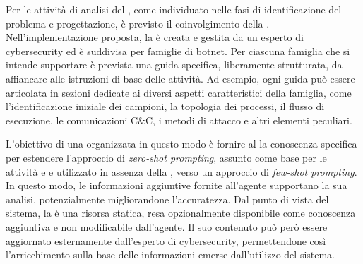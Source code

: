 Per le attività di analisi del \sreagent{}, come individuato nelle fasi di identificazione del problema e progettazione, è previsto il coinvolgimento della \kb{}. Nell'implementazione proposta, la \kb{} è creata e gestita da un esperto di cybersecurity ed è suddivisa per famiglie di botnet. Per ciascuna famiglia che si intende supportare è prevista una guida specifica, liberamente strutturata, da affiancare alle istruzioni di base delle attività. Ad esempio, ogni guida può essere articolata in sezioni dedicate ai diversi aspetti caratteristici della famiglia, come l'identificazione iniziale dei campioni, la topologia dei processi, il flusso di esecuzione, le comunicazioni C\&C, i metodi di attacco e altri elementi peculiari.




L'obiettivo di una \kb{} organizzata in questo modo è fornire al \sreagent{} la conoscenza specifica per estendere l'approccio di \emph{zero-shot prompting}, assunto come base per le attività \renaming{} e \reversing{} e utilizzato in assenza della \kb{}, verso un approccio di \emph{few-shot prompting}. In questo modo, le informazioni aggiuntive fornite all'agente supportano la sua analisi, potenzialmente migliorandone l'accuratezza. Dal punto di vista del sistema, la \kb{} è una risorsa statica, resa opzionalmente disponibile come conoscenza aggiuntiva e non modificabile dall'agente. Il suo contenuto può però essere aggiornato esternamente dall'esperto di cybersecurity, permettendone così l'arricchimento sulla base delle informazioni emerse dall'utilizzo del sistema.

